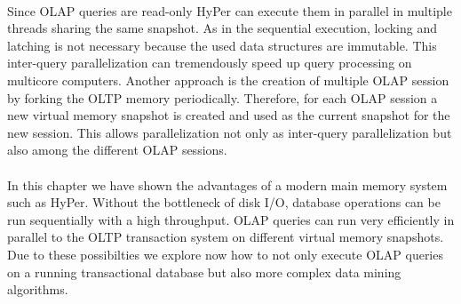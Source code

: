 \\
Since OLAP queries are read-only HyPer can execute them in parallel in multiple threads sharing the same snapshot. As in the sequential execution, locking and latching is not necessary because the used data structures are immutable. This inter-query parallelization can tremendously speed up query processing on multicore computers. Another approach is the creation of multiple OLAP session by forking the OLTP memory periodically. Therefore, for each OLAP session a new virtual memory snapshot is created and used as the current snapshot for the new session. This allows parallelization not only as inter-query parallelization but also among the different OLAP sessions.
\\ 
\\
In this chapter we have shown the advantages of a modern main memory system such as HyPer. Without the bottleneck of disk I/O, database operations can be run sequentially with a high throughput. OLAP queries can run very efficiently in parallel to the OLTP transaction system on different virtual memory snapshots. Due to these possibilties we explore now how to not only execute OLAP queries on a running transactional database but also more complex data mining algorithms.



